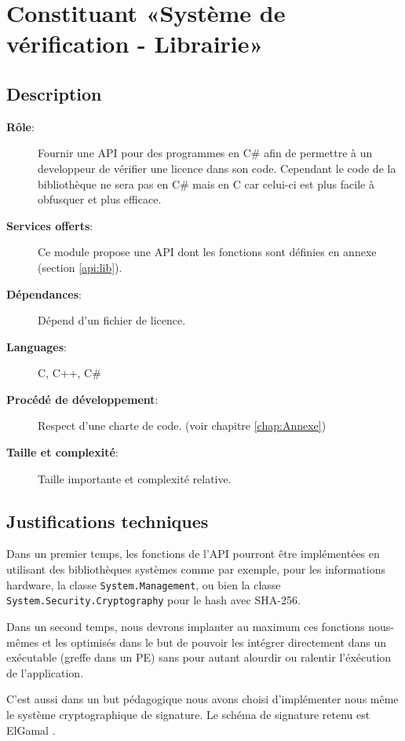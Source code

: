 \section{Constituant «Système de vérification - Librairie»}
\subsection*{Description}
\begin{description}
	\item[\textbf{Rôle}:]
		Fournir une API pour des programmes en C\# afin de 
		permettre à un developpeur de vérifier une licence dans son code.
        Cependant le code de la bibliothèque ne sera pas en C\# mais en 
        C car celui-ci est plus facile à obfusquer et plus efficace. 
	\item[\textbf{Services offerts}:]
        Ce module propose une API dont les fonctions sont définies en annexe
        (section \ref{api:lib}).
	\item[\textbf{Dépendances}:]
		Dépend d'un fichier de licence.	
	\item[\textbf{Languages}:]
		C, C++, C\#
	\item[\textbf{Procédé de développement}:]
		Respect d'une charte de code. (voir chapitre \ref{chap:Annexe})
	\item[\textbf{Taille et complexité}:]
		Taille importante et complexité relative.
\end{description}

\subsection*{Justifications techniques}
Dans un premier temps, les fonctions de l'API pourront être implémentées en utilisant des bibliothèques systèmes comme par exemple, pour les informations hardware, la classe \verb:System.Management:, ou bien la classe \verb:System.Security.Cryptography: pour le hash avec SHA-256.\newline

Dans un second temps, nous devrons implanter au maximum ces fonctions nous-mêmes et 
les optimisés dans le but de pouvoir les intégrer directement dans un 
exécutable (greffe dans un PE) sans pour autant alourdir ou ralentir l'éxécution de 
l'application. \newline

C'est aussi dans un but pédagogique nous avons choisi d'implémenter nous même le système cryptographique de signature. Le schéma de signature retenu est ElGamal \cite{ElGamal}.
\newpage

